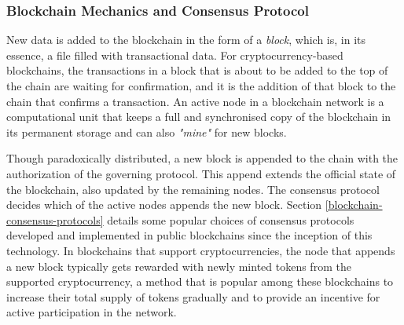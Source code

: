 \documentclass[../access.tex]{subfiles}
\begin{document}
    \subsubsection{Blockchain Mechanics and Consensus Protocol}
        \label{mining-consensus}
        New data is added to the blockchain in the form of a \textit{block}, which is, in its essence, a file filled with transactional data. For cryptocurrency-based blockchains, the transactions in a block that is about to be added to the top of the chain are waiting for confirmation, and it is the addition of that block to the chain that confirms a transaction. An active node in a blockchain network is a computational unit that keeps a full and synchronised copy of the blockchain in its permanent storage and can also \textit{"mine"} for new blocks.
        \par
        Though paradoxically distributed, a new block is appended to the chain with the authorization of the governing protocol. This append extends the official state of the blockchain, also updated by the remaining nodes. The consensus protocol decides which of the active nodes appends the new block. Section \ref{blockchain-consensus-protocols} details some popular choices of consensus protocols developed and implemented in public blockchains since the inception of this technology. In blockchains that support cryptocurrencies, the node that appends a new block typically gets rewarded with newly minted tokens from the supported cryptocurrency, a method that is popular among these blockchains to increase their total supply of tokens gradually and to provide an incentive for active participation in the network.
    
\end{document}
